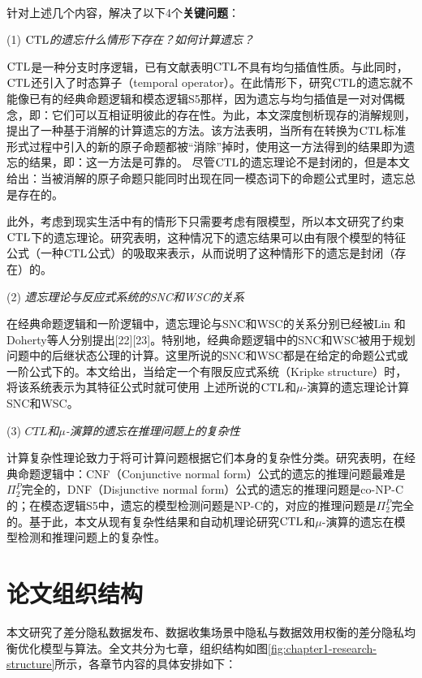 ~\\
针对上述几个内容，解决了以下4个\textbf{关键问题}：

(1) {\em $\textrm{CTL}$的遗忘什么情形下存在？如何计算遗忘？}

$\textrm{CTL}$是一种分支时序逻辑，已有文献表明$\textrm{CTL}$不具有均匀插值性质。与此同时，$\textrm{CTL}$还引入了时态算子（temporal operator）。在此情形下，研究$\textrm{CTL}$的遗忘就不能像已有的经典命题逻辑和模态逻辑S5那样，因为遗忘与均匀插值是一对对偶概念，即：它们可以互相证明彼此的存在性。为此，本文深度刨析现存的消解规则，提出了一种基于消解的计算遗忘的方法。该方法表明，当所有在转换为$\textrm{CTL}$标准形式过程中引入的新的原子命题都被“消除”掉时，使用这一方法得到的结果即为遗忘的结果，即：这一方法是可靠的。
尽管$\textrm{CTL}$的遗忘理论不是封闭的，但是本文给出：当被消解的原子命题只能同时出现在同一模态词下的命题公式里时，遗忘总是存在的。

此外，考虑到现实生活中有的情形下只需要考虑有限模型，所以本文研究了约束$\textrm{CTL}$下的遗忘理论。研究表明，这种情况下的遗忘结果可以由有限个模型的特征公式（一种$\textrm{CTL}$公式）的吸取来表示，从而说明了这种情形下的遗忘是封闭（存在）的。

(2) {\em 遗忘理论与反应式系统的SNC和WSC的关系}

在经典命题逻辑和一阶逻辑中，遗忘理论与SNC和WSC的关系分别已经被Lin 和 Doherty等人分别提出[22][23]。特别地，经典命题逻辑中的SNC和WSC被用于规划问题中的后继状态公理的计算。这里所说的SNC和WSC都是在给定的命题公式或一阶公式下的。本文给出，当给定一个有限反应式系统（Kripke structure）时，将该系统表示为其特征公式时就可使用
上述所说的$\textrm{CTL}$和$\mu$-演算的遗忘理论计算SNC和WSC。



(3) {\em $CTL$和$\mu$-演算的遗忘在推理问题上的复杂性}

计算复杂性理论致力于将可计算问题根据它们本身的复杂性分类。研究表明，在经典命题逻辑中：CNF（Conjunctive normal form）公式的遗忘的推理问题最难是$\Pi_2^P$完全的，DNF（Disjunctive normal form）公式的遗忘的推理问题是co-NP-C的；在模态逻辑S5中，遗忘的模型检测问题是NP-C的，对应的推理问题是$\Pi_2^P$完全的。基于此，本文从现有复杂性结果和自动机理论研究$\textrm{CTL}$和$\mu$-演算的遗忘在模型检测和推理问题上的复杂性。








\section{论文组织结构}
本文研究了差分隐私数据发布、数据收集场景中隐私与数据效用权衡的差分隐私均衡优化模型与算法。全文共分为七章，组织结构如图\ref{fig:chapter1-research-structure}所示，各章节内容的具体安排如下：

